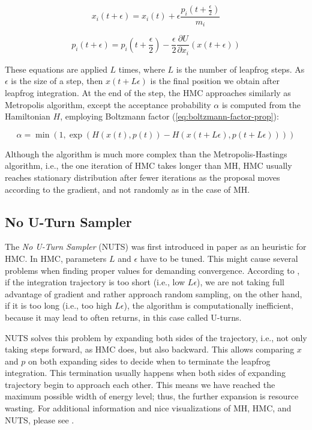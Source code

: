 \documentclass[
  digital, %
  oneside, %
  lof,     %
  lot,     %
]{fithesis4}
\begin{document}
\begin{equation}
  x_i(t + \epsilon) = x_i(t) + \epsilon \frac{p_i \left(t + \frac{\epsilon}{2} \right)}{m_i}
\end{equation}

\begin{equation}
  p_i(t + \epsilon) = p_i \left( t + \frac{\epsilon}{2} \right) - \frac{\epsilon}{2} \frac{\partial U}{\partial x_i} \left( x \left( t + \epsilon \right) \right)
\end{equation}

These equations are applied $L$ times, where $L$ is the number of leapfrog steps. 
As $\epsilon$ is the size of a step, then $x(t + L \epsilon)$ is the final position we obtain after leapfrog integration.
At the end of the step, the HMC approaches similarly as Metropolis algorithm, except the acceptance probability $\alpha$ is computed from the Hamiltonian $H$, employing Boltzmann factor (\ref{eq:boltzmann-factor-prop}):

\begin{equation}
  \alpha = \min \left( 1, \exp \left( H(x(t), p(t)) - H(x(t + L \epsilon), p(t + L \epsilon)) \right) \right)
\end{equation}

Although the algorithm is much more complex than the Metropolis-Hastings algorithm, i.e., the one iteration of HMC takes longer than MH, HMC usually reaches stationary distribution after fewer iterations as the proposal moves according to the gradient, and not randomly as in the case of MH.


\subsection{No U-Turn Sampler}
\label{sec:nuts}

The \textit{No U-Turn Sampler} (NUTS) was first introduced in 
paper \cite{hoffman2011} as an heuristic for HMC. 
In HMC, parameters $L$ and $\epsilon$ have to be tuned. 
This might cause several problems when finding proper values for demanding convergence.
According to \cite{betancourt2018}, if the integration trajectory is too short (i.e., low $L\epsilon$), we are not taking full advantage of gradient and rather approach random sampling, on the other hand, if it is too long (i.e., too high $L\epsilon$), the algorithm is computationally inefficient, because it may lead to often returns, in this case called U-turns.

NUTS solves this problem by expanding both sides of the trajectory, i.e., not only taking steps forward, as HMC does, but also backward.
This allows comparing $x$ and $p$ on both expanding sides to decide when to terminate the leapfrog integration.
This termination usually happens when both sides of expanding trajectory begin to approach each other.
This means we have reached the maximum possible width of energy level; thus, the further expansion is resource wasting.
For additional information and nice visualizations of MH, HMC, and NUTS, please see \cite{mcelreath2017}.
\end{document}
